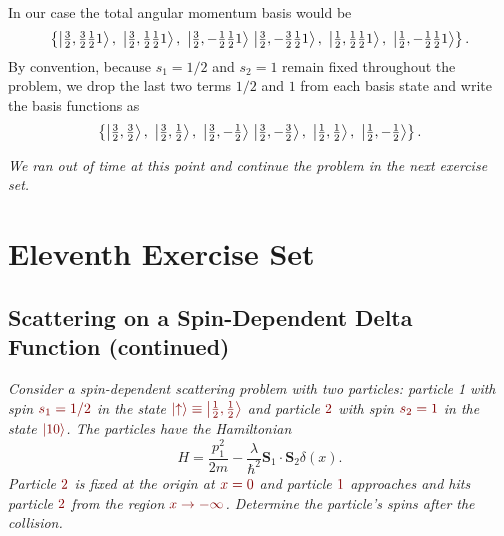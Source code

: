 \documentclass[11pt, a4paper]{article}
\newcommand{\dmath}[1]{\textcolor{Maroon}{#1}}  %
\renewcommand{\vec}[1]{\bm{#1}} %
\newcommand{\ua}{\uparrow}  %
\begin{document}
\begin{itemize}
\begin{enumerate}
		In our case the total angular momentum basis would be
		\begin{equation*}
			\left\{ \ket{\tfrac{3}{2}, \tfrac{3}{2} \tfrac{1}{2} 1},\  \ket{\tfrac{3}{2}, \tfrac{1}{2} \tfrac{1}{2} 1},\  \ket{\tfrac{3}{2}, -\tfrac{1}{2} \tfrac{1}{2} 1} \, \ket{\tfrac{3}{2}, -\tfrac{3}{2} \tfrac{1}{2} 1},\ \ket{\tfrac{1}{2}, \tfrac{1}{2} \tfrac{1}{2} 1},\  \ket{\tfrac{1}{2}, -\tfrac{1}{2} \tfrac{1}{2} 1}  \right\}.
		\end{equation*}
		By convention, because $ s_{1} = 1/2 $ and $ s_{2} = 1 $ remain fixed throughout the problem, we drop the last two terms $ 1/2 $ and $ 1 $ from each basis state and write the basis functions as
		\begin{equation*}
			\left\{ \ket{\tfrac{3}{2}, \tfrac{3}{2} },\  \ket{\tfrac{3}{2}, \tfrac{1}{2} },\  \ket{\tfrac{3}{2}, -\tfrac{1}{2} } \, \ket{\tfrac{3}{2}, -\tfrac{3}{2} },\ \ket{\tfrac{1}{2}, \tfrac{1}{2} },\  \ket{\tfrac{1}{2}, -\tfrac{1}{2}}  \right\}.
		\end{equation*}
				
	\end{enumerate}
	\textit{We ran out of time at this point and continue the problem in the next exercise set.}	
\end{itemize}



\section{Eleventh Exercise Set}

\subsection{Scattering on a Spin-Dependent Delta Function (continued)}
\textit{Consider a spin-dependent scattering problem with two particles: particle 1 with spin $ \dmath{s_{1} = 1/2} $ in the state $ \dmath{\ket{\ua} \equiv \ket{\tfrac{1}{2}, \tfrac{1}{2}}} $ and particle $ \dmath{2} $ with spin $ \dmath{s_{2} = 1} $ in the state $ \dmath{\ket{10}} $. The particles have the Hamiltonian}
\begin{equation*}
	H = \frac{p_{1}^{2}}{2m} - \frac{\lambda}{\hbar^{2}}\vec{S}_{1}\cdot \vec{S}_{2}\delta(x).
\end{equation*}
\textit{Particle $ \dmath{2} $ is fixed at the origin at $ \dmath{x = 0} $ and particle $ \dmath{1} $ approaches and hits particle $ \dmath{2} $ from the region $ \dmath{x \to -\infty} $. Determine the particle's spins after the collision.}
\end{document}
